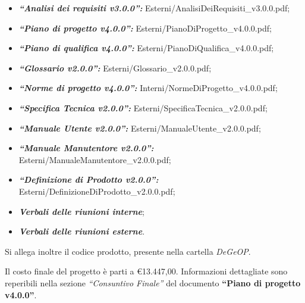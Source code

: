 \documentclass[a4paper,12pt]{letteracdp}
\begin{document}
\begin{letter}
	\begin{itemize}
        \item \textit{\textbf{“Analisi dei requisiti v3.0.0”:}} Esterni/AnalisiDeiRequisiti\_v3.0.0.pdf;
		\item \textit{\textbf{“Piano di progetto v4.0.0”:}} Esterni/PianoDiProgetto\_v4.0.0.pdf;
		\item \textit{\textbf{“Piano di qualifica v4.0.0”:}} Esterni/PianoDiQualifica\_v4.0.0.pdf;
		\item \textit{\textbf{“Glossario v2.0.0”:}} Esterni/Glossario\_v2.0.0.pdf;
		\item \textit{\textbf{“Norme di progetto v4.0.0”:}} Interni/NormeDiProgetto\_v4.0.0.pdf;
		\item \textit{\textbf{“Specifica Tecnica v2.0.0”:}} Esterni/SpecificaTecnica\_v2.0.0.pdf;
		\item \textit{\textbf{“Manuale Utente v2.0.0”:}} Esterni/ManualeUtente\_v2.0.0.pdf;
		\item \textit{\textbf{“Manuale Manutentore v2.0.0”:}} Esterni/ManualeManutentore\_v2.0.0.pdf;
		\item \textit{\textbf{“Definizione di Prodotto v2.0.0”:}} Esterni/DefinizioneDiProdotto\_v2.0.0.pdf;
		\item \textit{\textbf{Verbali delle riunioni interne}};
		\item \textit{\textbf{Verbali delle riunioni esterne}}.
	\end{itemize}
	Si allega inoltre il codice prodotto, presente nella cartella \textit{DeGeOP}.

	\noindent
Il costo finale del progetto è parti a \euro 13.447,00. Informazioni dettagliate sono reperibili nella sezione \textit{“Consuntivo Finale”} del documento \textbf{“Piano di progetto v4.0.0”}.


\end{letter}
\end{document}
